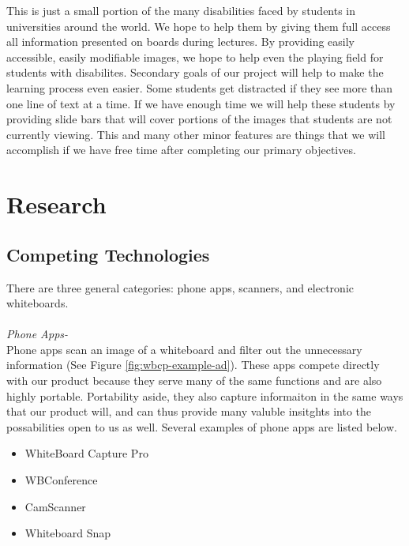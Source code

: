 \documentclass{article}
\begin{document}
This is just a small portion of the many disabilities faced by students in universities around the world. We hope to help them by giving them full access all information presented on boards during lectures. By providing easily accessible, easily modifiable images, we hope to help even the playing field for students with disabilites.
Secondary goals of our project will help to make the learning process even easier. Some students get distracted if they see more than one line of text at a time. If we have enough time we will help these students by providing slide bars that will cover portions of the images that students are not currently viewing. This and many other minor features are things that we will accomplish if we have free time after completing our primary objectives. 

	\section{Research}
		\subsection*{Competing Technologies}
			There are three general categories: phone apps, scanners, and electronic whiteboards.\\
			\\
			\emph{Phone Apps-}\\
Phone apps scan an image of a whiteboard and filter out the unnecessary information (See Figure \ref{fig:wbcp-example-ad}). These apps compete directly with our product because they serve many of the same functions and are also highly portable. Portability aside, they also capture informaiton in the same ways that our product will, and can thus provide many valuble insitghts into the possabilities open to us as well. Several examples of phone apps are listed below.

			\begin{itemize}
				\item WhiteBoard Capture Pro
				\item WBConference
				\item CamScanner
				\item Whiteboard Snap
			\end{itemize} 
			
\end{document}
